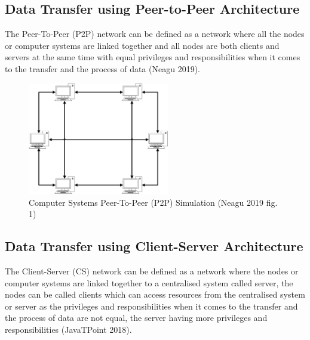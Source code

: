 \subsection{Data Transfer using Peer-to-Peer Architecture}

The Peer-To-Peer (P2P) network can be defined as a network where all the nodes or computer systems are linked
together and all nodes are both clients and servers at the same time with equal privileges and responsibilities
when it comes to the transfer and the process of data (Neagu 2019).

\begin{figure}[h]
    \centering
    \includegraphics[width=0.55\textwidth]{images/peer-to-peer.pdf}
    \captionsetup{justification=centering}
    \caption[Computer Systems Peer-To-Peer (P2P) Simulation]{Computer Systems Peer-To-Peer (P2P)
                                                             Simulation (Neagu 2019 fig. 1)}
    \label{fig:network-peer-to-peer}
\end{figure}

\subsection{Data Transfer using Client-Server Architecture}

The Client-Server (CS) network can be defined as a network where the nodes or computer systems are linked together
to a centralised system called server, the nodes can be called clients which can access resources from the
centralised system or server as the privileges and responsibilities when it comes to the transfer and the
process of data are not equal, the server having more privileges and responsibilities (JavaTPoint 2018).


